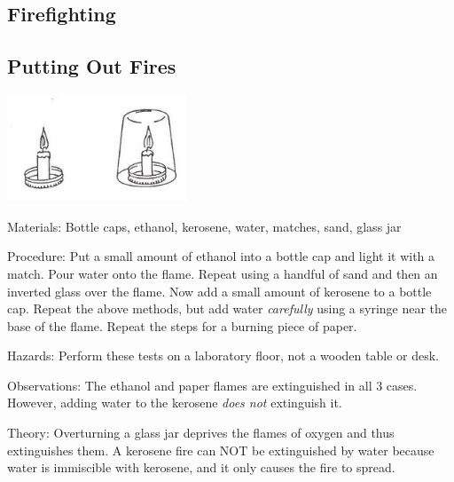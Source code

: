 \begin{multicols}{2}

\section*{Firefighting}


\subsection{Putting Out Fires} %

\begin{center}
\includegraphics[width=0.4\textwidth]{./img/source/fire-fighting.jpg}
\end{center}

\begin{description*}
\item[Materials:]{Bottle caps, ethanol, kerosene, water, matches, sand, glass jar}
\item[Procedure:]{Put a small amount of ethanol into a bottle cap and light it with a match. Pour water onto the flame. Repeat using a handful of sand and then an inverted glass over the flame. Now add a small amount of kerosene to a bottle cap. Repeat the above methods, but add water \emph{carefully} using a syringe near the base of the flame. Repeat the steps for a burning piece of paper.}
\item[Hazards:]{Perform these tests on a laboratory floor, not a wooden table or desk.}
\item[Observations:]{The ethanol and paper flames are extinguished in all 3 cases. However, adding water to the kerosene \emph{does not} extinguish it.}
\item[Theory:]{Overturning a glass jar deprives the flames of oxygen and thus extinguishes them. A kerosene fire can NOT be extinguished by water because water is immiscible with kerosene, and it only causes the fire to spread.}
\end{description*}


\end{multicols}

